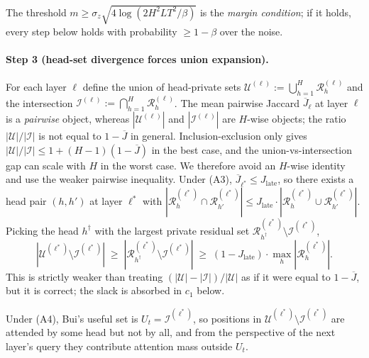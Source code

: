 \documentclass{article} %
\begin{document}
The threshold $m \geq \sigma_z \sqrt{4 \log(2 H^2 L T^2 / \beta)}$ is the
\emph{margin condition}; if it holds, every step below holds with
probability $\geq 1 - \beta$ over the noise.

\paragraph{Step 3 (head-set divergence forces union expansion).}
For each layer $\ell$ define the union of head-private sets
$\mathcal{U}^{(\ell)} := \bigcup_{h=1}^{H} \mathcal{R}^{(\ell)}_h$ and
the intersection $\mathcal{I}^{(\ell)} := \bigcap_{h=1}^{H}
\mathcal{R}^{(\ell)}_h$. The mean pairwise Jaccard $\overline{J}_\ell$
at layer $\ell$ is a \emph{pairwise} object, whereas
$|\mathcal{U}^{(\ell)}|$ and $|\mathcal{I}^{(\ell)}|$ are $H$-wise
objects; the ratio $|\mathcal{U}|/|\mathcal{I}|$ is not equal to $1 -
\overline{J}$ in general. Inclusion-exclusion only gives
$|\mathcal{U}|/|\mathcal{I}| \leq 1 + (H-1)(1 - \overline{J})$ in the
best case, and the union-vs-intersection gap can scale with $H$ in the
worst case. We therefore avoid an $H$-wise identity and use the weaker
pairwise inequality. Under (A3), $\overline{J}_{\ell^*} \leq
J_{\text{late}}$, so there exists a head pair $(h, h')$ at layer
$\ell^*$ with $|\mathcal{R}^{(\ell^*)}_h \cap
\mathcal{R}^{(\ell^*)}_{h'}| \leq J_{\text{late}} \cdot
|\mathcal{R}^{(\ell^*)}_h \cup \mathcal{R}^{(\ell^*)}_{h'}|$. Picking
the head $h^\dagger$ with the largest private residual set
$\mathcal{R}^{(\ell^*)}_{h^\dagger} \setminus \mathcal{I}^{(\ell^*)}$,
\begin{equation}
\label{eq:union-bound}
|\mathcal{U}^{(\ell^*)} \setminus \mathcal{I}^{(\ell^*)}|
\;\geq\;
|\mathcal{R}^{(\ell^*)}_{h^\dagger} \setminus \mathcal{I}^{(\ell^*)}|
\;\geq\;
(1 - J_{\text{late}}) \cdot \max_h |\mathcal{R}^{(\ell^*)}_h|.
\end{equation}
This is strictly weaker than treating $(|\mathcal{U}| -
|\mathcal{I}|)/|\mathcal{U}|$ as if it were equal to $1 -
\overline{J}$, but it is correct; the slack is absorbed in $c_1$ below.

Under (A4), Bui's useful set is $U_t = \mathcal{I}^{(\ell^*)}$, so
positions in $\mathcal{U}^{(\ell^*)} \setminus \mathcal{I}^{(\ell^*)}$
are attended by some head but not by all, and from the perspective of
the next layer's query they contribute attention mass outside $U_t$.
\end{document}
